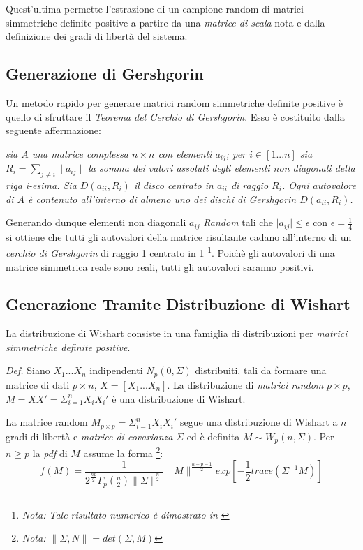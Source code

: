\documentclass[12pt,openright,a4paper]{article}
\begin{document}
Quest'ultima permette l'estrazione di un campione random di matrici simmetriche definite positive a partire da una\textit{ matrice di scala} nota e dalla definizione dei gradi di libertà del sistema.

\subsection{Generazione di Gershgorin}

Un metodo rapido per generare matrici random simmetriche definite positive è quello di sfruttare il \textit{Teorema del Cerchio di Gershgorin}.
Esso è costituito dalla seguente affermazione:

\textit{sia $A$ una matrice complessa $n \times n$ con elementi $a_{ij}$; per $i\in[1...n]$ sia $R_i=\sum_{j \neq i}\mid a_{ij} \mid$ la somma dei valori assoluti   degli elementi non diagonali della riga i-esima. Sia  $D(a_{ii}, R_i)$ il disco centrato in $a_{ii}$ di raggio $R_i$. Ogni autovalore di $A$ è contenuto all'interno di almeno uno dei dischi di Gershgorin $D(a_{ii}, R_i)$.} \cite{Gershgorin}

Generando dunque elementi non diagonali $ a_{ij}$ \textit{Random} tali che $ \mid a_{ij} \mid \leqslant \epsilon$ con $ \epsilon = \frac{1}{4} $ si ottiene che tutti gli autovalori della matrice risultante cadano all'interno di un \textit{cerchio di Gershgorin} di raggio 1 centrato in 1 \footnote{\textit{Nota: Tale risultato numerico è dimostrato in \cite{Gershgorin}}}. Poichè gli autovalori di una matrice simmetrica reale sono reali, tutti gli autovalori saranno positivi.

\subsection{Generazione Tramite Distribuzione di Wishart}

La distribuzione di Wishart consiste in una famiglia di distribuzioni per \textit{matrici simmetriche definite positive}.

\textit{Def.} Siano $X_1...X_n$ indipendenti $N_p(0,\Sigma)$ distribuiti, tali da formare una matrice di dati $p\times n$, $X=[X_1...X_n]$.
La distribuzione di \textit{matrici random} $p\times p$, $M=XX'=\Sigma^n_{i=1}X_iX_i'$ è una distribuzione di Wishart. \cite{AMS}

La matrice random $M_{p\times p}=\Sigma^n_{i=1}X_iX_i'$ segue una distribuzione di Wishart a $n$ gradi di libertà e \textit{matrice di covarianza} $\Sigma$ ed è definita $M\sim W_p(n, \Sigma)$.
Per $n\geq p$ la \textit{pdf} di $M$ assume la forma   \footnote{\textit{Nota: $\|\Sigma , N \| = det (\Sigma , M)$}}:  
\begin{equation}
f(M)=\frac{1}{2^{\frac{np}{2}}\Gamma_p(\frac{n}{2})\|\Sigma\|^{\frac{n}{2}}}\|M\|^{\frac{n-p-1}{2}}exp[-\frac{1}{2}trace(\Sigma^{-1}M)]
\label{Wishart-pdf}
\end{equation}
\end{document}
